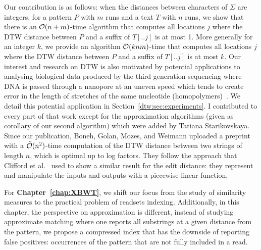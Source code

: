 Our contribution is as follows: when the distances between characters of $\Sigma$ are integers, for a pattern $P$ with $m$ runs and a text $T$ with $n$ runs, we show that there is an $\mathcal{O}(n+m)$-time algorithm that computes all locations $j$ where the DTW distance between $P$ and a suffix of $T[..j]$ is at most 1. More generally for an integer $k$, we provide an algorithm $\mathcal{O}(knm)$-time that computes all locations $j$ where the DTW distance between $P$ and a suffix of $T[..j]$ is at most $k$.
Our interest and research on DTW is also motivated by potential applications to analysing biological data produced by the third generation sequencing where DNA is passed through a nanopore at an uneven speed which tends to create error in the length of stretches of the same nucleotide (homopolymers)~\cite{delahaye2021sequencing}. We detail this potential application in Section~\ref{dtw:sec:experiments}.
I contributed to every part of that work except for the approximation algorithms (given as corollary of our second algorithm) which were added by Tatiana Starikovskaya.
Since our publication, Boneh, Golan, Mozes, and Weimann uploaded a preprint~\cite{boneh2023near} with a $\tilde{\mathcal{O}}(n^2)$-time computation of the DTW distance between two strings of length $n$, which is optimal up to log factors. They follow the approach that Clifford et al.~\cite{clifford2019rle} used to show a similar result for the edit distance: they represent and manipulate the inputs and outputs with a piecewise-linear function.



For \textbf{Chapter~\ref{chap:XBWT}}, we shift our focus from the study of similarity measures to the practical problem of readsets indexing. 
Additionally, in this chapter, the perspective on approximation is different, instead of studying approximate matching where one reports all substrings at a given distance from the pattern, we propose a compressed index that has the downside of reporting false positives: occurrences of the pattern that are not fully included in a read.

